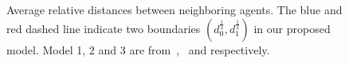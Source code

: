 \begin{figure}[H]
  \centering
  \quad
  \caption{Average relative distances between neighboring agents. The blue and red dashed line indicate two boundaries $(d_0^{\frac{1}{2}}, d_1^{\frac{1}{2}})$ in our proposed model. Model 1, 2 and 3 are from~\cite{Vicsek1995},~\cite{CuckerSmale2007} and \cite{CuckerDong2010} respectively.}\label{fig:N_dis}
\end{figure}

